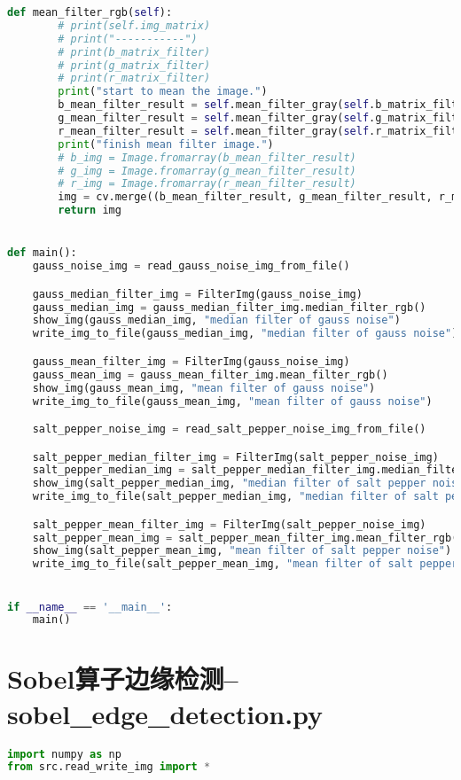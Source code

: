 \documentclass{hitreport}
\begin{document}
\begin{appendices}
\begin{lstlisting}[language=python]
    def mean_filter_rgb(self):
        # print(self.img_matrix)
        # print("-----------")
        # print(b_matrix_filter)
        # print(g_matrix_filter)
        # print(r_matrix_filter)
        print("start to mean the image.")
        b_mean_filter_result = self.mean_filter_gray(self.b_matrix_filter)
        g_mean_filter_result = self.mean_filter_gray(self.g_matrix_filter)
        r_mean_filter_result = self.mean_filter_gray(self.r_matrix_filter)
        print("finish mean filter image.")
        # b_img = Image.fromarray(b_mean_filter_result)
        # g_img = Image.fromarray(g_mean_filter_result)
        # r_img = Image.fromarray(r_mean_filter_result)
        img = cv.merge((b_mean_filter_result, g_mean_filter_result, r_mean_filter_result))
        return img


def main():
    gauss_noise_img = read_gauss_noise_img_from_file()

    gauss_median_filter_img = FilterImg(gauss_noise_img)
    gauss_median_img = gauss_median_filter_img.median_filter_rgb()
    show_img(gauss_median_img, "median filter of gauss noise")
    write_img_to_file(gauss_median_img, "median filter of gauss noise")

    gauss_mean_filter_img = FilterImg(gauss_noise_img)
    gauss_mean_img = gauss_mean_filter_img.mean_filter_rgb()
    show_img(gauss_mean_img, "mean filter of gauss noise")
    write_img_to_file(gauss_mean_img, "mean filter of gauss noise")

    salt_pepper_noise_img = read_salt_pepper_noise_img_from_file()

    salt_pepper_median_filter_img = FilterImg(salt_pepper_noise_img)
    salt_pepper_median_img = salt_pepper_median_filter_img.median_filter_rgb()
    show_img(salt_pepper_median_img, "median filter of salt pepper noise")
    write_img_to_file(salt_pepper_median_img, "median filter of salt pepper noise")

    salt_pepper_mean_filter_img = FilterImg(salt_pepper_noise_img)
    salt_pepper_mean_img = salt_pepper_mean_filter_img.mean_filter_rgb()
    show_img(salt_pepper_mean_img, "mean filter of salt pepper noise")
    write_img_to_file(salt_pepper_mean_img, "mean filter of salt pepper noise")


if __name__ == '__main__':
    main()

\end{lstlisting}

\section{Sobel算子边缘检测--sobel\_edge\_detection.py}\label{app:sobel}
\begin{lstlisting}[language=python]
import numpy as np
from src.read_write_img import *



\end{lstlisting}
\end{appendices}
\end{document}
